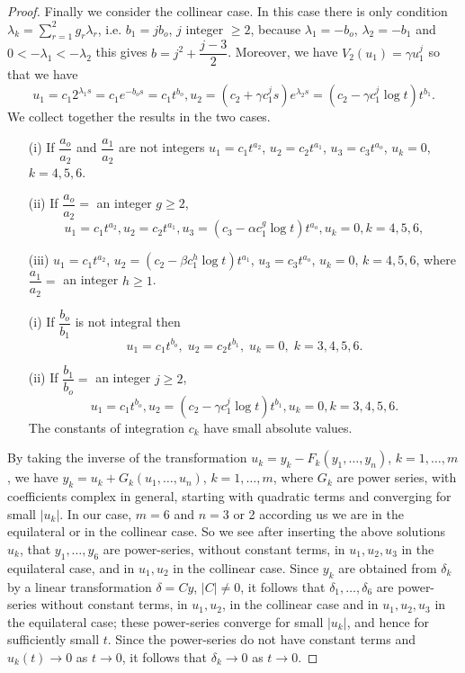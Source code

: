 \begin{proof}
Finally we consider the collinear case. In this case there is only
condition $\lambda_k = \sum\limits^2_{r=1} g_r \lambda_r$, i.e. $b_1
=j b_o$, $j$ integer $\geq 2$, because $\lambda_1 = - b_o$,
$\lambda_2=-b_1$ and $0 < -\lambda_1 < -\lambda_2$ this gives $b = j^2
+ \dfrac{j-3}{2}$. Moreover, we have $V_2 (u_1) = \gamma u^j_1$ so
that we have  
$$
u_1 = c_1 2^{\lambda_1s} = c_1 e^{-b_o s} = c_1 t^{b_o}, u_2 = (c_2+
\gamma c^j_1 s) e^{\lambda_2 s} = (c_2 -\gamma c^j_1 \log t) t^{b_1}.  
$$\pageoriginale
We collect together the results in the two cases. 

\medskip
{}
\begin{itemize}
\item[{\rm(i)}] If $\dfrac{a_o}{a_2}$ and $\dfrac{a_1}{a_2}$ are not
  integers $u_1 = c_1 t^{a_2}$, $u_2 = c_2 t^{a_1}$, $u_3 = c_3
  t^{a_o}$, $u_k = 0$, $k=4, 5,6$. 

\item[{\rm(ii)}] If $\dfrac{a_o}{a_2} = $ an integer $g \geq 2$,
$$
u_1 = c_1 t^{a_2}, u_2 = c_2 t^{a_1}, u_3 = (c_3 - \alpha c^g_1 \log
t) t^{a_o}, u_k =0, k=4,5,6, 
$$

\item[{\rm(iii)}] $u_1 = c_1 t^{a_2}$, $u_2 = (c_2 - \beta c^h_1 \log
  t) t^{a_1}$, $u_3 = c_3 t^{a_o}$, $u_k = 0 $, $k=4,5,6$, where
  $\dfrac{a_1}{a_2} = $ an integer $h \geq 1$. 
\end{itemize}

\medskip
{}
\begin{itemize}
\item[{\rm (i)}] If $\dfrac{b_o}{b_1}$ is not integral then
$$
u_1 = c_1 t^{b_o}, \; u_2 = c_2 t^{b_1}, \; u_k = 0, \; k = 3,4,5,6.
$$

\item[{\rm (ii)}] If $\dfrac{b_1}{b_o} = $ an integer $j \geq 2$,
$$
u_1 = c_1 t^{b_o}, u_2 = (c_2 - \gamma c^j_1 \log t)t^{b_1}, u_k =0, k
= 3,4,5,6. 
$$ 
The constants of integration $c_k$ have small absolute values.
\end{itemize}

By taking the inverse of the transformation $u_k = y_k - F_k (y_1,
\ldots, y_n)$, $k=1, \ldots, m$, we have $y_k = u_k + G_k (u_1,
\ldots, u_n)$, $k=1, \ldots,m$, where $G_k$ are power series, with
coefficients complex in general, starting with quadratic terms and
converging for small $|u_k|$. In our case, $m=6$ and $n=3$ or 2
according us we are in the equilateral or in the\pageoriginale
collinear case. So we see after inserting the above solutions $u_k$,
that $y_1, \ldots, y_6$ are power-series, without constant terms, in
$u_1, u_2, u_3$ in the equilateral case, and in  $u_1, u_2$ in the
collinear case. Since $y_k$ are obtained from $\delta_k$ by a linear
transformation $\delta = Cy$, $|C| \neq 0$, it follows that $\delta_1,
\ldots, \delta_6$ are power-series without constant terms, in $u_1,
u_2$, in the collinear case and in $u_1,u_2,u_3$ in the equilateral
case; these power-series converge for small $|u_k|$, and hence for
sufficiently small $t$. Since the power-series do not have constant
terms and $u_k (t) \to 0$ as $t \to 0$, it follows that  
$\delta_k \to 0$ as $t \to 0$.


\end{proof}
